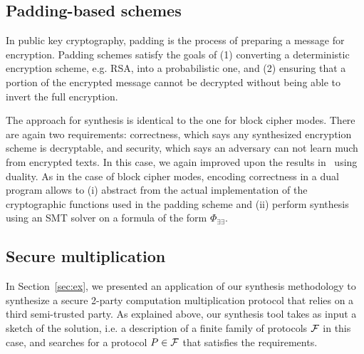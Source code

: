 \documentclass[preprint]{sig-alternate-05-2015}
\begin{document}
\subsection{Padding-based schemes}

In public key cryptography, padding is the process of preparing a
message for encryption.  %
Padding schemes %
satisfy the goals of (1) converting a deterministic
encryption scheme, e.g. RSA, into a probabilistic one, and (2)
ensuring that a portion of the encrypted message cannot be decrypted
without being able to invert the full encryption.


The approach for synthesis is identical to the one for block cipher modes.
There are again two requirements: 
correctness, which says any synthesized encryption scheme is decryptable,
and security, which says an adversary can not learn much from encrypted texts.
In this case, we again improved upon the results in~\cite{TGD15:CADE}
using duality. As in the case of
block cipher modes, encoding correctness in a dual program
allows to (i) abstract from the actual implementation of
the cryptographic functions used in the padding scheme and
(ii) perform synthesis using an SMT solver on a formula of the form $\Phi_{\exists\exists}$.


\subsection{Secure multiplication}
In Section~\ref{sec:ex}, we presented an application
of our synthesis methodology to synthesize a secure 2-party
computation multiplication protocol that relies on a third semi-trusted
party. As explained above, our synthesis tool takes as input a sketch of the 
solution, i.e. a description of a finite family of protocols 
${\cal F}$ in this case, and searches for a protocol $P\in{\cal F}$
that satisfies the requirements. 
\end{document}
